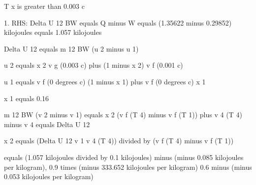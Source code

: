 T x is greater than 0.003 c

1. RHS:
Delta U 12 BW equals Q minus W equals (1.35622 minus 0.29852) kilojoules equals 1.057 kilojoules

Delta U 12 equals m 12 BW (u 2 minus u 1)

u 2 equals x 2 v g (0.003 c) plus (1 minus x 2) v f (0.001 c)

u 1 equals v f (0 degrees c) (1 minus x 1) plus v f (0 degrees c) x 1

x 1 equals 0.16

m 12 BW (v 2 minus v 1) equals x 2 (v f (T 4) minus v f (T 1)) plus v 4 (T 4) minus v 4 equals Delta U 12

x 2 equals (Delta U 12 v 1 v 4 (T 4)) divided by (v f (T 4) minus v f (T 1))

equals (1.057 kilojoules divided by 0.1 kilojoules) minus (minus 0.085 kilojoules per kilogram), 0.9 times (minus 333.652 kilojoules per kilogram) 0.6 minus (minus 0.053 kilojoules per kilogram)